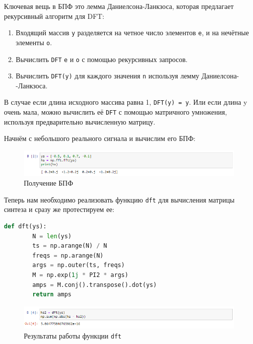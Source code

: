 \documentclass[a4paper]{article}
\begin{document}
            Ключевая вещь в БПФ это лемма Даниелсона-Ланкзоса, которая предлагает рекурсивный алгоритм для DFT:
            
            \begin{enumerate}
                \item Входящий массив \texttt{y} разделяется на четное число элементов \texttt{e}, и на нечётные элементы \texttt{o}.
                \item Вычислить \texttt{DFT} \texttt{e} и \texttt{o} с помощью рекурсивных запросов.
                \item Вычислить \texttt{DFT(y)} для каждого значения \texttt{n} используя лемму Даниелсона-\\-Ланкзоса.
            \end{enumerate}

            В случае если длина исходного массива равна 1, \texttt{DFT(y) = y}. Или если длина y очень мала, можно вычислить её \texttt{DFT} с помощью матричного умножения, используя предварительно вычисленную матрицу.
            
            Начнём с небольшого реального сигнала и вычислим его БПФ:
            
             \begin{figure}[H]
                \centering
                \includegraphics[width=\textwidth]{ex_2_fft.png}
                \caption{Получение БПФ}
                \label{fig:ex_2_dfr_result}
            \end{figure}
            
            Теперь нам необходимо реализовать функцию \texttt{dft} для вычисления матрицы синтеза и сразу же протестируем ее:
            
\begin{lstlisting}[language=Python, caption= Функция \texttt{dft}]
    def dft(ys):
        N = len(ys)
        ts = np.arange(N) / N
        freqs = np.arange(N)
        args = np.outer(ts, freqs)
        M = np.exp(1j * PI2 * args)
        amps = M.conj().transpose().dot(ys)
        return amps
\end{lstlisting}
            
            \begin{figure}[H]
                \centering
                \includegraphics[width=\textwidth]{ex_2_dfr_result.png}
                \caption{Результаты работы функции \texttt{dft}}
                \label{fig:ex_2_dfr_result}
            \end{figure}
            
\end{document}
